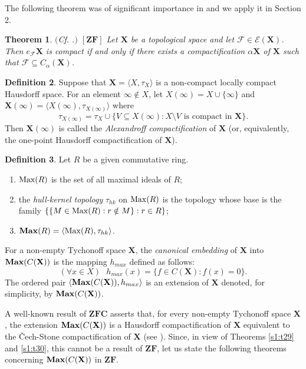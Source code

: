 \documentclass[12pt,twoside,leqno]{article}
\theoremstyle{plain}
\newtheorem{theorem}{Theorem}[section]
\theoremstyle{definition}
\newtheorem{definition}[theorem]{Definition}
\theoremstyle{remark}
\DeclareMathOperator{\Max}{{\rm Max}}
\DeclareMathOperator{\BMax}{\bf{Max}}
\begin{document}
The following theorem was of significant importance in \cite{kw1} and we apply it in Section 2.

\begin{theorem}
	\label{s1:t31}
	$($Cf. \cite[Theorem 3.1]{kw1}.$)$ $[\mathbf{ZF}]$ Let $\mathbf{X}$ be a topological space and let $\mathcal{F}\in\mathcal{E}(\mathbf{X})$. Then $e_{\mathcal{F}}\mathbf{X}$ is compact if and only if there exists a  compactification $\alpha\mathbf{X}$ of $\mathbf{X}$ such that $\mathcal{F}\subseteq C_{\alpha}(\mathbf{X})$.
\end{theorem}

\begin{definition}
	\label{s1:d32}
	Suppose that $\mathbf{X}=\langle X, \tau_X\rangle$ is a non-compact locally compact Hausdorff space. For an element  $\infty\notin X$, let $X(\infty)=X\cup\{\infty\}$ and $\mathbf{X}(\infty)=\langle X(\infty), \tau_{X(\infty)}\rangle$ where 
	$$\tau_{X(\infty)}=\tau_X\cup\{ V\subseteq X(\infty): X\setminus V \text{ is compact in } \mathbf{X}\}.$$
	Then $\mathbf{X}(\infty)$ is called the \emph{Alexandroff compactification} of $\mathbf{X}$ (or, equivalently, the one-point Hausdorff compactification of $\mathbf{X}$).
\end{definition}

\begin{definition}
	\label{s1:d33}
	Let $R$ be a given commutative ring. 
	\begin{enumerate}
		\item[(i)] $\Max(R)$ is the set of all maximal ideals of $R$;
		\item[(ii)]  the \emph{hull-kernel topology} $\tau_{hk}$ on $\Max(R)$  is the topology whose base is the family $\{\{M\in\Max(R): r\notin M\}: r\in R\}$; 
		\item[(iii)] $\BMax(R)=\langle \Max(R), \tau_{hk}\rangle$.
	\end{enumerate}
\end{definition}

For a non-empty Tychonoff space $\mathbf{X}$, the \emph{canonical embedding} of $\mathbf{X}$ into $\BMax(C(\mathbf{X}))$ is the mapping $h_{max}$ defined as follows:
$$(\forall x\in X) \text{ } h_{max}(x)=\{f\in C(\mathbf{X}): f(x)=0\}.$$
The ordered pair $\langle\BMax(C(\mathbf{X})), h_{max}\rangle$ is an extension of $\mathbf{X}$ denoted, for simplicity, by $\BMax(C(\mathbf{X}))$. 

A well-known result of $\mathbf{ZFC}$ asserts that, for every non-empty Tychonoff space $\mathbf{X}$, the extension $\BMax(C(\mathbf{X}))$ is a Hausdorff compactification of $\mathbf{X}$ equivalent to the \v Cech-Stone compactification of $\mathbf{X}$ (see \cite[Chapter 7.11]{gj}). Since, in view of Theorems \ref{s1:t29} and \ref{s1:t30}, this cannot be a result of $\mathbf{ZF}$, let us state the following theorems concerning $\BMax(C(\mathbf{X}))$ in $\mathbf{ZF}$. 
\end{document}
